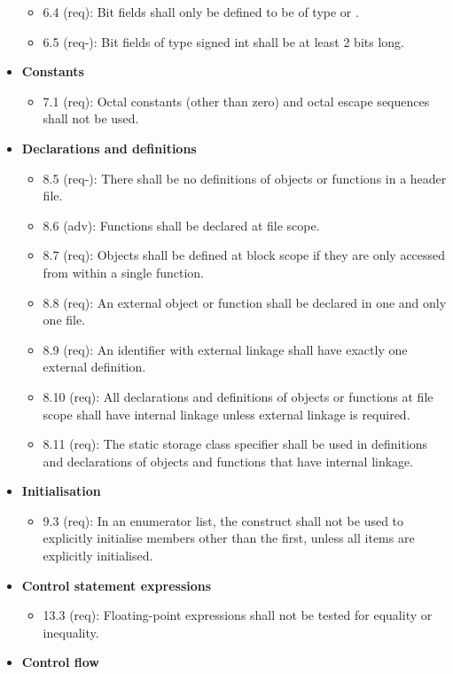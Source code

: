 \begin{itemize}
\begin{itemize}
\item 6.4 (req): Bit fields shall only be defined to be of type  or .
\item 6.5 (req-): Bit fields of type signed int shall be at least 2 bits long.
\end{itemize}
\item \textbf{Constants}
\begin{itemize}
\item 7.1 (req): Octal constants (other than zero) and octal escape sequences shall not be used.
\end{itemize}
\item \textbf{Declarations and definitions}
\begin{itemize}
\item 8.5 (req-): There shall be no definitions of objects or functions in a header file.
\item 8.6 (adv): Functions shall be declared at file scope.
\item 8.7 (req): Objects shall be defined at block scope if they are only accessed from within a single function.
\item 8.8 (req): An external object or function shall be declared in one and only one file.
\item 8.9 (req): An identifier with external linkage shall have exactly one external definition.
\item 8.10 (req): All declarations and definitions of objects or functions at file scope shall have internal linkage unless external linkage is required.
\item 8.11 (req): The static storage class specifier shall be used in definitions and declarations of objects and functions that have internal linkage.
\end{itemize}
\item \textbf{Initialisation}
\begin{itemize}
\item 9.3 (req): In an enumerator list, the \inl{=} construct shall not be used to explicitly initialise members other than the first, unless all items are explicitly initialised.
\end{itemize}
\item \textbf{Control statement expressions}
\begin{itemize}
\item 13.3 (req): Floating-point expressions shall not be tested for equality or inequality.
\end{itemize}
\item \textbf{Control flow}

\end{itemize}

